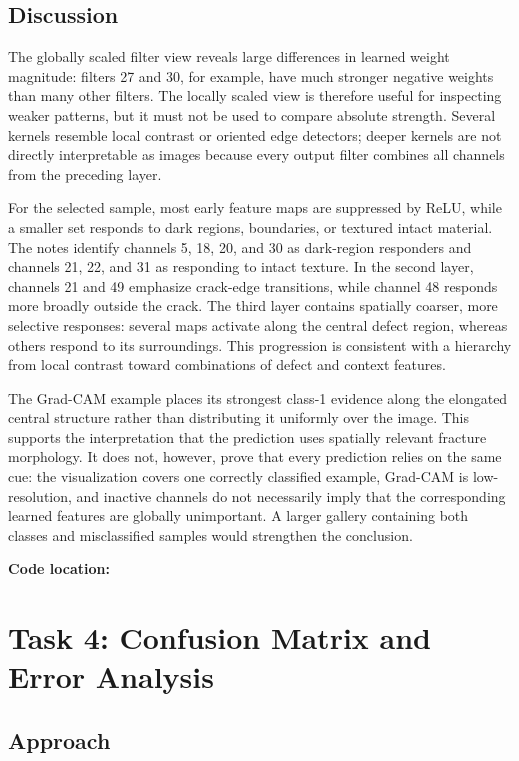 \documentclass[11pt]{article}
\newcommand{\codelocation}[1]{\par\smallskip\noindent\textbf{Code location:} \path{#1}}
\begin{document}
\subsection{Discussion}

The globally scaled filter view reveals large differences in learned weight magnitude: filters 27 and 30, for example, have much stronger negative weights than many other filters. The locally scaled view is therefore useful for inspecting weaker patterns, but it must not be used to compare absolute strength. Several kernels resemble local contrast or oriented edge detectors; deeper kernels are not directly interpretable as images because every output filter combines all channels from the preceding layer.

For the selected sample, most early feature maps are suppressed by ReLU, while a smaller set responds to dark regions, boundaries, or textured intact material. The notes identify channels 5, 18, 20, and 30 as dark-region responders and channels 21, 22, and 31 as responding to intact texture. In the second layer, channels 21 and 49 emphasize crack-edge transitions, while channel 48 responds more broadly outside the crack. The third layer contains spatially coarser, more selective responses: several maps activate along the central defect region, whereas others respond to its surroundings. This progression is consistent with a hierarchy from local contrast toward combinations of defect and context features.

The Grad-CAM example places its strongest class-1 evidence along the elongated central structure rather than distributing it uniformly over the image. This supports the interpretation that the prediction uses spatially relevant fracture morphology. It does not, however, prove that every prediction relies on the same cue: the visualization covers one correctly classified example, Grad-CAM is low-resolution, and inactive channels do not necessarily imply that the corresponding learned features are globally unimportant. A larger gallery containing both classes and misclassified samples would strengthen the conclusion.

\codelocation{tasks/task_3_interpretability/}

\clearpage
\section{Task 4: Confusion Matrix and Error Analysis}

\subsection{Approach}
\end{document}
